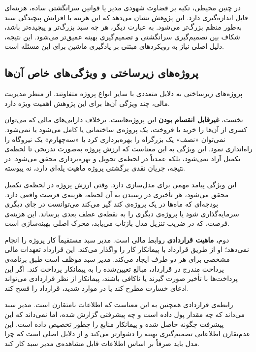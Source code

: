 در چنین محیطی، تکیه بر قضاوت شهودی مدیر یا قوانین سرانگشتی
ساده، هزینه‌ای قابل اندازه‌گیری دارد. این پژوهش نشان می‌دهد که
این هزینه با افزایش پیچیدگی سبد به‌طور منظم بزرگ‌تر می‌شود.
به عبارت دیگر، هر چه سبد بزرگ‌تر و پیچیده‌تر باشد، شکاف بین
تصمیم‌گیری سرانگشتی و تصمیم‌گیری بهینه عمیق‌تر می‌شود. این
نتیجه، دلیل اصلی نیاز به رویکردهای مبتنی بر یادگیری ماشین برای
این مسئله است.

\subsection{پروژه‌های زیرساختی و ویژگی‌های خاص آن‌ها}
\label{subsec:infra_characteristics}

پروژه‌های زیرساختی به دلایل متعددی با سایر انواع پروژه متفاوتند.
از منظر مدیریت مالی، چند ویژگی آن‌ها برای این پژوهش اهمیت ویژه دارد.

نخست، \textbf{غیرقابل انقسام بودن} این پروژه‌هاست. برخلاف دارایی‌های
مالی که می‌توان کسری از آن‌ها را خرید یا فروخت، یک پروژه‌ی ساختمانی
یا کامل می‌شود یا نمی‌شود. نمی‌توان «نصف» یک بزرگراه را بهره‌برداری
کرد یا «سه‌چهارم» یک نیروگاه را راه‌اندازی نمود. این ویژگی به این
معناست که ارزش پروژه به‌صورت تدریجی تا لحظه‌ی تکمیل آزاد نمی‌شود،
بلکه عمدتاً در لحظه‌ی تحویل و بهره‌برداری محقق می‌شود. در نتیجه،
جریان نقدی برگشتی پروژه ماهیت پله‌ای دارد، نه پیوسته.

این ویژگی پیامد مهمی برای مدل‌سازی دارد. وقتی ارزش پروژه در لحظه‌ی
تکمیل محقق می‌شود، هر تأخیری در رسیدن به آن لحظه، هزینه‌ی فرصت
واقعی دارد. بودجه‌ای که ماه‌ها در یک پروژه‌ی کند گیر می‌کند
می‌توانست در جای دیگری سرمایه‌گذاری شود یا پروژه‌ی دیگری را
به نقطه‌ی عطف بعدی برساند. این هزینه‌ی فرصت، که در ضریب تنزیل
مدل بازتاب می‌یابد، محرک اصلی بهینه‌سازی است.

دوم، \textbf{ماهیت قراردادی} روابط مالی است. مدیر سبد مستقیماً کار
پروژه را انجام نمی‌دهد؛ او از طریق قرارداد با پیمانکار کار را
واگذار می‌کند. این قرارداد تعهدات مالی مشخصی برای هر دو طرف ایجاد
می‌کند. مدیر سبد موظف است طبق برنامه‌ی پرداخت مندرج در قرارداد،
مبالغ تعیین‌شده را به پیمانکار پرداخت کند. اگر این پرداخت‌ها با
تأخیر صورت گیرند یا ناکافی باشند، پیمانکار از نظر قراردادی
می‌تواند ادعای خسارت مطرح کند یا در موارد شدید، قرارداد را فسخ
کند.

رابطه‌ی قراردادی همچنین به این معناست که اطلاعات نامتقارن است. مدیر
سبد می‌داند که چه مقدار پول داده است و چه پیشرفتی گزارش شده، اما
نمی‌داند که این پیشرفت چگونه حاصل شده و پیمانکار منابع را چطور
تخصیص داده است. این عدم‌تقارن اطلاعاتی تصمیم‌گیری بهینه را دشوارتر
می‌کند و از دلایل اصلی است که چرا مدل باید صرفاً بر اساس اطلاعات
قابل مشاهده‌ی مدیر سبد کار کند.

